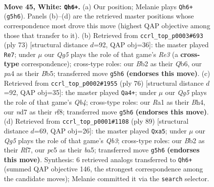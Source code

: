 \documentclass[11pt]{article}
\begin{document}
\clearpage

\begin{figure}[p]\centering
\begin{subfigure}{0.46\textwidth}\centering
\resizebox{\linewidth}{!}{%
\newchessgame
\chessboard[
  setfen={3q1k2/1b1n1p2/3P1n2/2p3Q1/p6P/5pP1/PB6/R5K1 w - - 3 45},
  showmover=false,
  pgfstyle=straightmove, color=movearrow, markmove={g5-h6}
]}
\caption{}
\end{subfigure}\hfill
\begin{subfigure}{0.46\textwidth}\centering
\resizebox{\linewidth}{!}{%
\newchessgame
\chessboard[
  setfen={6k1/5Np1/pq2rn1p/1b2NQ2/8/2P4P/6PK/4R3 b - - 4 37},
  showmover=false,
  pgfstyle=straightmove, color=movearrow, markmove={e6-e7}
]}
\caption{}
\end{subfigure}
\\[4pt]
\begin{subfigure}{0.46\textwidth}\centering
\resizebox{\linewidth}{!}{%
\newchessgame
\chessboard[
  setfen={k4r2/2p5/2Pn2q1/7p/1Q2p2B/2P1P2P/1K2B3/8 w - - 5 39},
  showmover=false,
  pgfstyle=straightmove, color=movearrow, markmove={b4-a4}
]}
\caption{}
\end{subfigure}\hfill
\begin{subfigure}{0.46\textwidth}\centering
\resizebox{\linewidth}{!}{%
\newchessgame
\chessboard[
  setfen={4r1k1/5r2/1q5p/B2p2p1/P2N4/3Q1N1P/6P1/6K1 b - - 0 45},
  showmover=false,
  pgfstyle=straightmove, color=movearrow, markmove={b6-a5}
]}
\caption{}
\end{subfigure}
\caption{\textbf{Move 45, White: \texttt{Qh6+}.} (a) Our position; Melanie plays \texttt{Qh6+} (\texttt{g5h6}). Panels (b)--(d) are the retrieved master positions whose correspondence most drove this move (highest QAP objective among those that transfer to it). (b) Retrieved from \texttt{ccrl\_top\_p0003\#693} (ply 73) [structural distance $d$=92, QAP obj=36]: the master played \texttt{Re7}; under $\mu$ our \emph{Qg5} plays the role of that game's \emph{Re3} (a \textbf{cross-type} correspondence); cross-type roles: our \emph{B}b2 as their \emph{Q}b6, our \emph{p}a4 as their \emph{B}b5; transferred move \texttt{g5h6} \textbf{(endorses this move)}. (c) Retrieved from \texttt{ccrl\_top\_p0002\#1955} (ply 76) [structural distance $d$=92, QAP obj=35]: the master played \texttt{Qa4+}; under $\mu$ our \emph{Qg5} plays the role of that game's \emph{Qb4}; cross-type roles: our \emph{R}a1 as their \emph{B}h4, our \emph{n}d7 as their \emph{r}f8; transferred move \texttt{g5h6} \textbf{(endorses this move)}. (d) Retrieved from \texttt{ccrl\_top\_p0001\#1108} (ply 89) [structural distance $d$=69, QAP obj=26]: the master played \texttt{Qxa5}; under $\mu$ our \emph{Qg5} plays the role of that game's \emph{Qb3}; cross-type roles: our \emph{B}b2 as their \emph{R}f7, our \emph{p}c5 as their \emph{b}a5; transferred move \texttt{g5h6} \textbf{(endorses this move)}. Synthesis: 6 retrieved analogs transferred to \texttt{Qh6+} (summed QAP objective 146, the strongest correspondence among the candidate moves); Melanie committed it via the \texttt{search} selector.}
\label{fig:thought-m88}
\end{figure}
\end{document}
